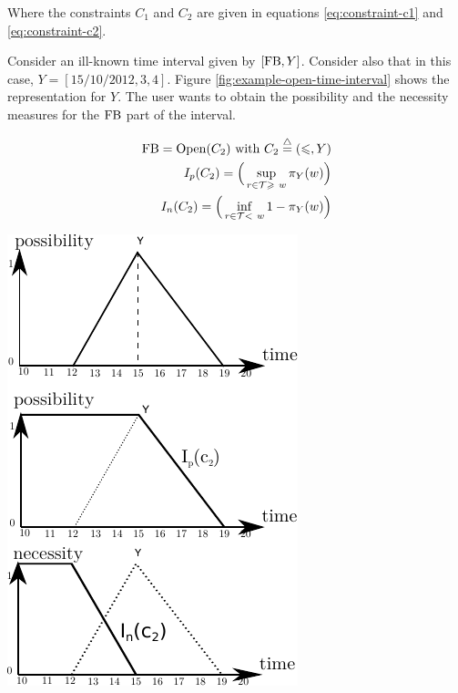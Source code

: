 Where the constraints $C_1$ and $C_2$ are given in equations \eqref{eq:constraint-c1} and \eqref{eq:constraint-c2}.

\begin{example}
\label{ex:open-time-interval}
Consider an ill-known time interval given by $\left[\operatorname{FB}, Y \right]$. Consider also that in this case, $Y= \left[15/10/2012,3,4 \right] $. Figure \ref{fig:example-open-time-interval} shows the representation for $Y$. The user wants to obtain the possibility and the necessity measures for the $\operatorname{FB}$ part of the interval.
\end{example}

\begin{eqnarray}
\nonumber
\operatorname{FB} = \operatorname{Open}(C_2) \mbox{ with } C_2\stackrel{\triangle}{=}\left(\leqslant,Y\right)\\
\nonumber
I_p(C_2)= \Big(\sup_{r\in\mathcal{T} \geqslant\  w}\pi_{Y}(w)\Big)\\
\nonumber
I_n(C_2) = \Big(\inf_{r\in\mathcal{T} <\  w}1-\pi_{Y}(w)\Big)
\end{eqnarray}


\vspace*{13pt}
\begin{center}
{
\includegraphics[scale=1]{./graphs/open-time-interval.pdf}
\label{fig:example-open-time-interval}
}
\end{center}
\vspace*{10pt}
\vspace*{13pt}


